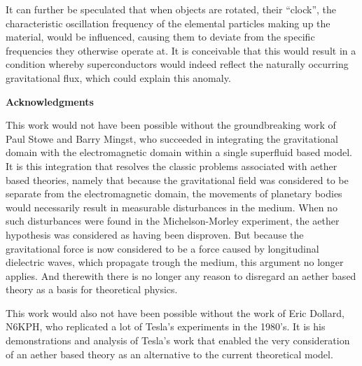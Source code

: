 \documentclass[a4paper]{article}
\newcommand\textstyleNone[1]{#1}
\begin{document}
{
\textstyleNone{{It can further be speculated that when objects are
rotated, their ``clock'', the characteristic oscillation frequency of the elemental particles making up the material,
would be influenced, causing them to deviate from the specific frequencies they otherwise operate at. It is conceivable
that this would result in a condition whereby superconductors would indeed reflect the naturally occurring
gravitational flux, which could explain this anomaly.}}}

{\centering
\textstyleNone{\textbf{{Acknowledgments}}}
\par}

{
\textstyleNone{This work would not have been possible without the groundbreaking work of Paul Stowe and Barry Mingst,
who succeeded in integrating the gravitational domain with the electromagnetic domain within a single superfluid based
model. It is this integration that resolves the classic problems associated with aether based theories, namely that
because the gravitational field was considered to be separate from the electromagnetic domain, the movements of
planetary bodies would necessarily result in measurable disturbances in the medium. When no such disturbances were
found in the Michelson-Morley experiment, the aether hypothesis was considered as having been disproven. But because
the gravitational force is now considered to }\textstyleNone{be a force caused by longitudinal dielectric waves, which
propagate trough the medium, this argument no longer applies. And therewith there is no longer any reason to disregard
an aether based theory as a basis for theoretical physics.}}

{
\textstyleNone{This work would also not have been possible without the work of Eric Dollard, N6KPH, who replicated a lot
of Tesla's experiments in the 1980's. It is his demonstrations and analysis of Tesla's work that enabled the very
consideration of an aether based theory as an alternative to the current theoretical model.}}
\end{document}
